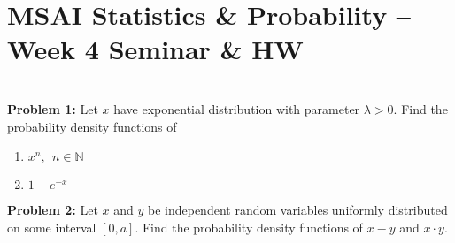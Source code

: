 \documentclass[12pt]{article}
\numberwithin{equation}{section}
\begin{document}
\section*{MSAI Statistics \& Probability – Week 4 Seminar \& HW}\\

\textbf{Problem 1:} Let $x$ have exponential distribution with parameter $\lambda>0$. Find the probability density functions of 
\begin{enumerate}
    \item $x^n,~~n\in\mathbb{N}$
    \item $1-e^{- x}$
\end{enumerate}

\textbf{Problem 2:} Let $x$ and $y$ be independent random variables uniformly distributed on some interval $[0,a]$. Find the probability density functions of $x-y$ and $x\cdot y$.
\end{document}
